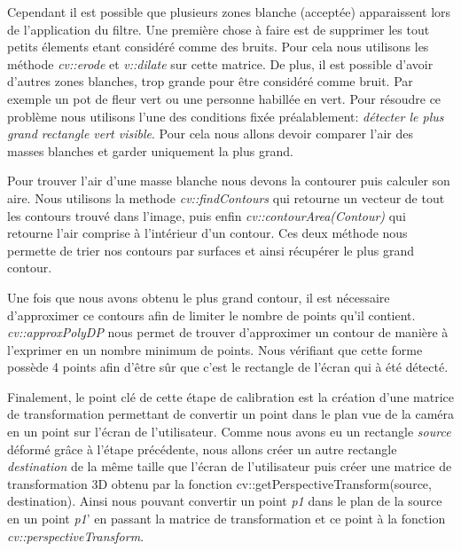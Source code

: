 \documentclass[11pt,a4paper,oldfontcommands]{memoir}
\begin{document}
Cependant il est possible que plusieurs zones blanche (acceptée) apparaissent lors de l'application du filtre. Une première chose à faire est de supprimer les tout petits élements etant considéré comme des bruits. Pour cela nous utilisons les méthode \textit{cv::erode} et \textit{v::dilate} sur cette matrice. De plus, il est possible d'avoir d'autres zones blanches, trop grande pour être considéré comme bruit. Par exemple un pot de fleur vert ou une personne habillée en vert. Pour résoudre ce problème nous utilisons l'une des conditions fixée préalablement: \textit{détecter le plus grand rectangle vert visible}. Pour cela nous allons devoir comparer l'air des masses blanches et garder uniquement la plus grand.

Pour trouver l'air d'une masse blanche nous devons la contourer puis calculer son aire. Nous utilisons la methode \textit{cv::findContours} qui retourne un vecteur de tout les contours trouvé dans l'image, puis enfin \textit{cv::contourArea(Contour)} qui retourne l'air comprise à l'intérieur d'un contour. Ces deux méthode nous permette de trier nos contours par surfaces et ainsi récupérer le plus grand contour.

Une fois que nous avons obtenu le plus grand contour, il est nécessaire d'approximer ce contours afin de limiter le nombre de points qu'il contient. \textit{cv::approxPolyDP} nous permet de trouver d'approximer un contour de manière à l'exprimer en un nombre minimum de points. Nous vérifiant que cette forme possède 4 points afin d'être sûr que c'est le rectangle de l'écran qui à été détecté.

Finalement, le point clé de cette étape de calibration est la création d'une matrice de transformation permettant de convertir un point dans le plan vue de la caméra en un point sur l'écran de l'utilisateur. Comme nous avons eu un rectangle \textit{source} déformé grâce à l'étape précédente, nous allons créer un autre rectangle \textit{destination} de la même taille que l'écran de l'utilisateur puis créer une matrice de transformation 3D obtenu par la fonction cv::getPerspectiveTransform(source, destination). Ainsi nous pouvant convertir un point \textit{p1} dans le plan de la source en un point \textit{p1}' en passant la matrice de transformation et ce point à la fonction \textit{cv::perspectiveTransform}.
\end{document}

